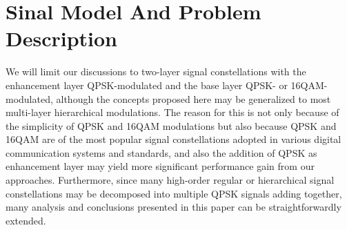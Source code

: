 \documentclass[10pt,fleqn, twocolumn]{IEEEtran}
\begin{document}
\section{Sinal Model And Problem Description}
We will limit our discussions to two-layer signal constellations
with the enhancement layer QPSK-modulated and the base layer QPSK-
or 16QAM-modulated, although the concepts proposed here may be
generalized to most multi-layer hierarchical modulations. The
reason for this is not only because of the simplicity of QPSK and
16QAM modulations but also because QPSK and 16QAM are of the most
popular signal constellations adopted in various digital
communication systems and standards, and also the addition of QPSK
as enhancement layer may yield more significant performance gain
from our approaches. Furthermore, since many high-order regular or
hierarchical signal constellations may be decomposed into multiple
QPSK signals adding together, many analysis and conclusions
presented in this paper can be straightforwardly extended.
\end{document}
